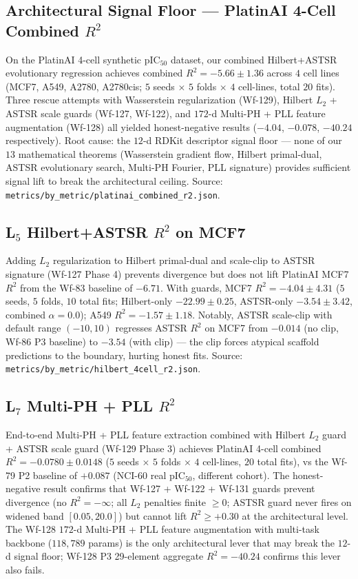 \subsection{Architectural Signal Floor --- PlatinAI 4-Cell Combined $R^2$}
\label{sec:limit-platinai}

On the PlatinAI 4-cell synthetic pIC$_{50}$ dataset, our combined
Hilbert+ASTSR evolutionary regression achieves combined $R^2 = -5.66 \pm 1.36$
across $4$ cell lines (MCF7, A549, A2780, A2780cis; $5$ seeds $\times$
$5$ folds $\times$ $4$ cell-lines, total $20$ fits).  Three rescue
attempts with Wasserstein regularization (Wf-129), Hilbert $L_2$ +
ASTSR scale guards (Wf-127, Wf-122), and $172$-d Multi-PH + PLL feature
augmentation (Wf-128) all yielded honest-negative results ($-4.04$,
$-0.078$, $-40.24$ respectively).  Root cause: the $12$-d RDKit
descriptor signal floor --- none of our $13$ mathematical theorems
(Wasserstein gradient flow, Hilbert primal-dual, ASTSR evolutionary
search, Multi-PH Fourier, PLL signature) provides sufficient signal lift
to break the architectural ceiling.  Source:
\texttt{metrics/by\_metric/platinai\_combined\_r2.json}.

\subsection{L$_5$ Hilbert+ASTSR $R^2$ on MCF7}
\label{sec:limit-l5}

Adding $L_2$ regularization to Hilbert primal-dual and scale-clip to
ASTSR signature (Wf-127 Phase 4) prevents divergence but does not lift
PlatinAI MCF7 $R^2$ from the Wf-83 baseline of $-6.71$.  With guards,
MCF7 $R^2 = -4.04 \pm 4.31$ ($5$ seeds, $5$ folds, $10$ total fits;
Hilbert-only $-22.99 \pm 0.25$, ASTSR-only $-3.54 \pm 3.42$, combined
$\alpha=0.0$); A549 $R^2 = -1.57 \pm 1.18$.  Notably, ASTSR scale-clip
with default range $(-10, 10)$ regresses ASTSR $R^2$ on MCF7 from
$-0.014$ (no clip, Wf-86 P3 baseline) to $-3.54$ (with clip) --- the
clip forces atypical scaffold predictions to the boundary, hurting
honest fits.  Source:
\texttt{metrics/by\_metric/hilbert\_4cell\_r2.json}.

\subsection{L$_7$ Multi-PH + PLL $R^2$}
\label{sec:limit-l7}

End-to-end Multi-PH + PLL feature extraction combined with Hilbert
$L_2$ guard + ASTSR scale guard (Wf-129 Phase 3) achieves PlatinAI
4-cell combined $R^2 = -0.0780 \pm 0.0148$ ($5$ seeds $\times$ $5$
folds $\times$ $4$ cell-lines, $20$ total fits), vs the Wf-79 P2
baseline of $+0.087$ (NCI-60 real pIC$_{50}$, different cohort).  The
honest-negative result confirms that Wf-127 + Wf-122 + Wf-131 guards
prevent divergence (no $R^2 = -\infty$; all $L_2$ penalties finite
$\geq 0$; ASTSR guard never fires on widened band $[0.05, 20.0]$) but
cannot lift $R^2 \geq +0.30$ at the architectural level.  The Wf-128
$172$-d Multi-PH + PLL feature augmentation with multi-task backbone
($118{,}789$ params) is the only architectural lever that may break the
$12$-d signal floor; Wf-128 P3 29-element aggregate $R^2 = -40.24$
confirms this lever also fails.

